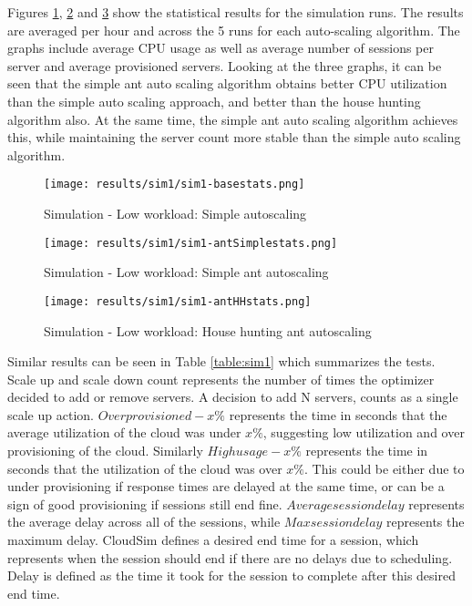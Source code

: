 Figures \ref{fig:sim1-basestats}, \ref{fig:sim1-antSimplestats} and \ref{fig:sim1-antHHstats} show the statistical results for the simulation runs. The results are averaged per hour and across the 5 runs for each auto-scaling algorithm. The graphs include average CPU usage as well as average number of sessions per server and average provisioned servers. Looking at the three graphs, it can be seen that the simple ant auto scaling algorithm obtains better CPU utilization than the simple auto scaling approach, and better than the house hunting algorithm also. At the same time, the simple ant auto scaling algorithm achieves this, while maintaining the server count more stable than the simple auto scaling algorithm.

\begin{figure}
	\centering
		\texttt{[image: results/sim1/sim1-basestats.png]}
	\caption{Simulation - Low workload: Simple autoscaling}
	\label{fig:sim1-basestats}
\end{figure}

\begin{figure}
	\centering
		\texttt{[image: results/sim1/sim1-antSimplestats.png]}
	\caption{Simulation - Low workload: Simple ant autoscaling}
	\label{fig:sim1-antSimplestats}
\end{figure}

\begin{figure}
	\centering
		\texttt{[image: results/sim1/sim1-antHHstats.png]}
	\caption{Simulation - Low workload: House hunting ant autoscaling}
	\label{fig:sim1-antHHstats}
\end{figure}

Similar results can be seen in Table \ref{table:sim1} which summarizes the tests. Scale up and scale down count represents the number of times the optimizer decided to add or remove servers. A decision to add N servers, counts as a single scale up action. $Over provisioned - x\%$ represents the time in seconds that the average utilization of the cloud was under $x\%$, suggesting low utilization and over provisioning of the cloud. Similarly $High usage - x\%$ represents the time in seconds that the utilization of the cloud was over $x\%$. This could be either due to under provisioning if response times are delayed at the same time, or can be a sign of good provisioning if sessions still end fine. $Average session delay$ represents the average delay across all of the sessions, while $Max session delay$ represents the maximum delay. CloudSim defines a desired end time for a session, which represents when the session should end if there are no delays due to scheduling. Delay is defined as the time it took for the session to complete after this desired end time.


